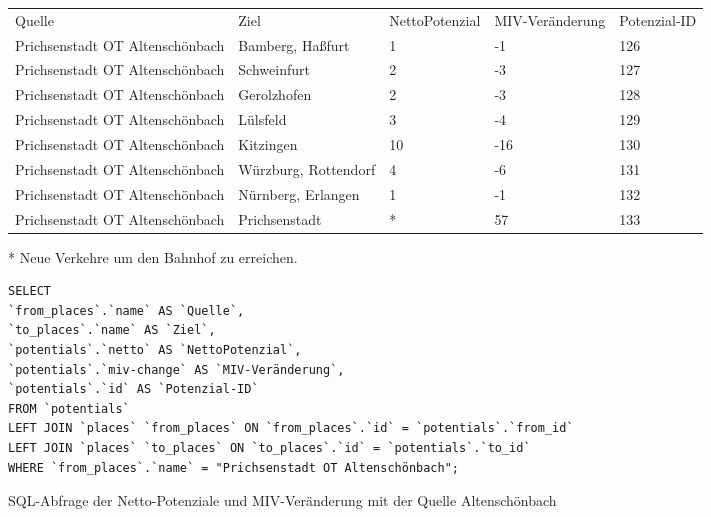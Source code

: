 \begin{tabular}{ l  l  l  l  l }
Quelle & Ziel & NettoPotenzial & MIV-Veränderung & Potenzial-ID\\ 
Prichsenstadt OT Altenschönbach & Bamberg, Haßfurt & 1 & -1 & 126\\ 
Prichsenstadt OT Altenschönbach & Schweinfurt & 2 & -3 & 127\\ 
Prichsenstadt OT Altenschönbach & Gerolzhofen & 2 & -3 & 128\\ 
Prichsenstadt OT Altenschönbach & Lülsfeld & 3 & -4 & 129\\ 
Prichsenstadt OT Altenschönbach & Kitzingen & 10 & -16 & 130\\ 
Prichsenstadt OT Altenschönbach & Würzburg, Rottendorf & 4 & -6 & 131\\ 
Prichsenstadt OT Altenschönbach & Nürnberg, Erlangen & 1 & -1 & 132\\ 
Prichsenstadt OT Altenschönbach & Prichsenstadt & * & 57 & 133\\ 
\end{tabular}    
\newline
\newline
* Neue Verkehre um den Bahnhof zu erreichen.
\newline
\begin{listing}[htbp]
\begin{verbatim}
SELECT
`from_places`.`name` AS `Quelle`, 
`to_places`.`name` AS `Ziel`, 
`potentials`.`netto` AS `NettoPotenzial`, 
`potentials`.`miv-change` AS `MIV-Veränderung`, 
`potentials`.`id` AS `Potenzial-ID` 
FROM `potentials`
LEFT JOIN `places` `from_places` ON `from_places`.`id` = `potentials`.`from_id`
LEFT JOIN `places` `to_places` ON `to_places`.`id` = `potentials`.`to_id`
WHERE `from_places`.`name` = "Prichsenstadt OT Altenschönbach";
\end{verbatim}
\caption{SQL-Abfrage der Netto-Potenziale und MIV-Veränderung mit der Quelle Altenschönbach}\label{lst-fz-altenschoenbach}
\end{listing}